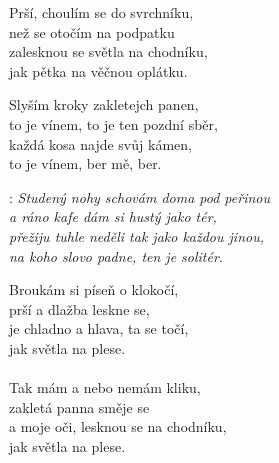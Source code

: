 
Prší, choulím se do svrchníku,\\
než se otočím na podpatku\\
zalesknou se světla na chodníku,\\
jak pětka na věčnou oplátku.\\

\begin{Large}

Slyším kroky zakletejch panen,\\
to je vínem, to je ten pozdní sběr,\\
každá kosa najde svůj kámen,\\
to je vínem, ber mě, ber.\\

\end{Large}

\textregistered:
\emph{
Studený nohy schovám doma pod peřinou\\
a ráno kafe dám si hustý jako tér,\\
přežiju tuhle neděli tak jako každou jinou,\\
na koho slovo padne, ten je solitér.\\
}

\begin{Large}

Broukám si píseň o klokočí,\\
prší a dlažba leskne se,\\
je chladno a hlava, ta se točí,\\
jak světla na plese.\\

\textregistered{}\\

Tak mám a nebo nemám kliku,\\
zakletá panna směje se\\
a moje oči, lesknou se na chodníku,\\
jak světla na plese.\\

\textregistered{}

\end{Large}

\newpage
